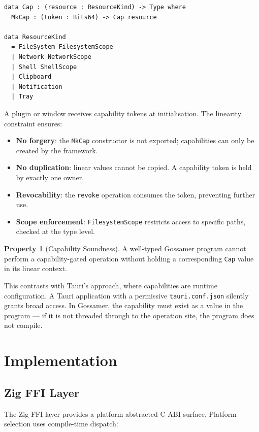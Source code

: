 \documentclass[11pt,a4paper]{article}
\theoremstyle{definition}
\newtheorem{property}{Property}[section]
\begin{document}
\begin{lstlisting}[style=idris]
data Cap : (resource : ResourceKind) -> Type where
  MkCap : (token : Bits64) -> Cap resource

data ResourceKind
  = FileSystem FilesystemScope
  | Network NetworkScope
  | Shell ShellScope
  | Clipboard
  | Notification
  | Tray
\end{lstlisting}

A plugin or window receives capability tokens at initialisation. The
linearity constraint ensures:

\begin{itemize}[nosep]
  \item \textbf{No forgery}: the \texttt{MkCap} constructor is not
    exported; capabilities can only be created by the framework.
  \item \textbf{No duplication}: linear values cannot be copied.
    A capability token is held by exactly one owner.
  \item \textbf{Revocability}: the \texttt{revoke} operation consumes
    the token, preventing further use.
  \item \textbf{Scope enforcement}: \texttt{FilesystemScope} restricts
    access to specific paths, checked at the type level.
\end{itemize}

\begin{property}[Capability Soundness]
A well-typed Gossamer program cannot perform a capability-gated
operation without holding a corresponding \texttt{Cap} value in its
linear context.
\end{property}

This contrasts with Tauri's approach, where capabilities are runtime
configuration. A Tauri application with a permissive
\texttt{tauri.conf.json} silently grants broad access. In Gossamer,
the capability must exist as a value in the program --- if it is not
threaded through to the operation site, the program does not compile.

\section{Implementation}
\label{sec:implementation}

\subsection{Zig FFI Layer}

The Zig FFI layer provides a platform-abstracted C ABI surface.
Platform selection uses compile-time dispatch:
\end{document}
